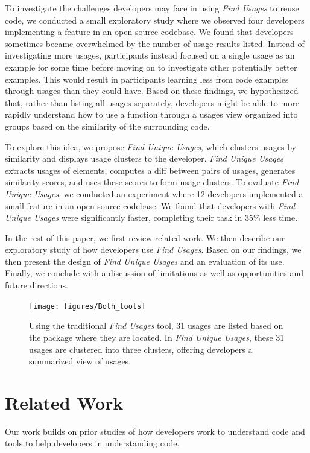 \documentclass[conference]{IEEEtran}
\begin{document}
To investigate the challenges developers may face in using \textit{Find Usages} to reuse code, we conducted a small exploratory study where we observed four developers implementing a feature in an open source codebase. We found that developers sometimes became overwhelmed by the number of usage results listed. Instead of investigating more usages, participants instead focused on a single usage as an example for some time before moving on to investigate other potentially better examples. This would result in participants learning less from code examples through usages than they could have.
Based on these findings, we hypothesized that, rather than listing all usages separately, developers might be able to more rapidly understand how to use a function through a usages view organized into groups based on the similarity of the surrounding code. \par

To explore this idea, we propose \textit{Find Unique Usages}, which clusters usages by similarity and displays usage clusters to the developer. \textit{Find Unique Usages} extracts usages of elements, computes a diff between pairs of usages, generates similarity scores, and uses these scores to form usage clusters.
To evaluate \textit{Find Unique Usages}, we conducted  an experiment where 12 developers implemented a small feature in an open-source codebase. We found that developers with \textit{Find Unique Usages} were significantly faster, completing their task in 35\% less time.\par

In the rest of this paper, we first review related work. We then describe our exploratory study of how developers use \textit{Find Usages}. Based on our findings, we then present the design of \textit{Find Unique Usages} and an evaluation of its use. Finally, we conclude with a discussion of limitations as well as opportunities and future directions.

\begin{figure}
    \centering
    \texttt{[image: figures/Both\_tools]}
    \caption{Using the traditional \textit{Find Usages} tool, 31 usages are listed based on the package where they are located. In \textit{Find Unique Usages}, these 31 usages are clustered into three clusters, offering developers a summarized view of usages.}
\label{fig:compare}
\end{figure}
\section{Related Work}
Our work builds on prior studies of how developers work to understand code and tools to help developers in understanding code.
\end{document}
